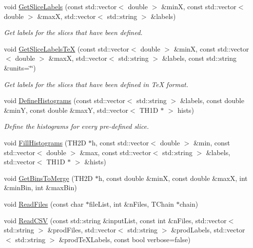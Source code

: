 \begin{DoxyCompactItemize}
void \hyperlink{namespacecalib_a5a983ce6a49b9859e49c9d3edb73b60e}{Get\-Slice\-Labels} (const std\-::vector$<$ double $>$ \&min\-X, const std\-::vector$<$ double $>$ \&max\-X, std\-::vector$<$ std\-::string $>$ \&labels)
\begin{DoxyCompactList}\small\item\em Get labels for the slices that have been defined. \end{DoxyCompactList}\item 
void \hyperlink{namespacecalib_abd137fd17c09e5cd7f72cce6747df25d}{Get\-Slice\-Labels\-Te\-X} (const std\-::vector$<$ double $>$ \&min\-X, const std\-::vector$<$ double $>$ \&max\-X, std\-::vector$<$ std\-::string $>$ \&labels, const std\-::string \&units=\char`\"{}\char`\"{})
\begin{DoxyCompactList}\small\item\em Get labels for the slices that have been defined in Te\-X format. \end{DoxyCompactList}\item 
void \hyperlink{namespacecalib_a0c91c7c7722a9fb26ab6c875525abb28}{Define\-Histograms} (const std\-::vector$<$ std\-::string $>$ \&labels, const double \&min\-Y, const double \&max\-Y, std\-::vector$<$ T\-H1\-D $\ast$ $>$ hists)
\begin{DoxyCompactList}\small\item\em Define the histograms for every pre-\/defined slice. \end{DoxyCompactList}\item 
void \hyperlink{namespacecalib_aa22908bcf9b16a83f1208d56eeded460}{Fill\-Histograms} (T\-H2\-D $\ast$h, const std\-::vector$<$ double $>$ \&min, const std\-::vector$<$ double $>$ \&max, const std\-::vector$<$ std\-::string $>$ \&labels, std\-::vector$<$ T\-H1\-D $\ast$ $>$ \&hists)
\item 
void \hyperlink{namespacecalib_a32e9a8dfc31d0d22703fda42cf1b2757}{Get\-Bins\-To\-Merge} (T\-H2\-D $\ast$h, const double \&min\-X, const double \&max\-X, int \&min\-Bin, int \&max\-Bin)
\item 
void \hyperlink{namespacecalib_aafd5f5728779f4c79d95f34203b6218f}{Read\-Files} (const char $\ast$file\-List, int \&n\-Files, T\-Chain $\ast$chain)
\item 
void \hyperlink{namespacecalib_a9223ec4660abfa7c4c749e3ef4954e03}{Read\-C\-S\-V} (const std\-::string \&input\-List, const int \&n\-Files, std\-::vector$<$ std\-::string $>$ \&prod\-Files, std\-::vector$<$ std\-::string $>$ \&prod\-Labels, std\-::vector$<$ std\-::string $>$ \&prod\-Te\-X\-Labels, const bool verbose=false)

\end{DoxyCompactItemize}
